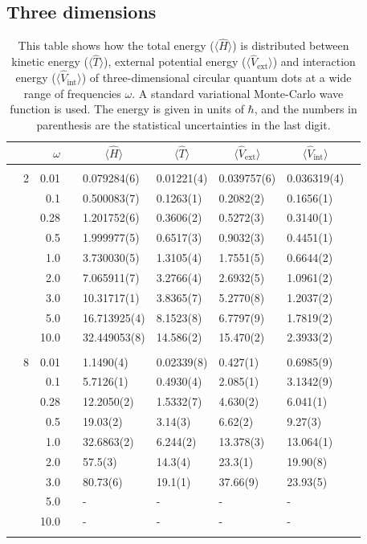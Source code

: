 \subsection{Three dimensions}
\begin{table}
	\caption{This table shows how the total energy ($\langle\hat{H}\rangle$) is distributed between kinetic energy ($\langle\hat{T}\rangle$), external potential energy ($\langle\hat{V}_{\text{ext}}\rangle$) and interaction energy ($\langle\hat{V}_{\text{int}}\rangle$) of three-dimensional circular quantum dots at a wide range of frequencies $\omega$. A standard variational Monte-Carlo wave function is used. The energy is given in units of $\hbar$, and the numbers in parenthesis are the statistical uncertainties in the last digit.}
	\label{tab:splitfrequencyQDVMC3D}
	\begin{tabularx}{\textwidth}{R{1cm}rrcR{2.3cm}R{2.3cm}R{2.3cm}R{2.3cm}R{1cm}} \hline\hline
		&\makecell{\\ \phantom{$N$} \\ \phantom{=}} & $\omega$ &&  &  &  &  & \\ \hline \\
		&2 & 0.01 && 0.079284(6) & 0.01221(4) & 0.039757(6) & 0.036319(4) \\
		&& 0.1 && 0.500083(7) & 0.1263(1) & 0.2082(2) & 0.1656(1) \\
		&& 0.28 && 1.201752(6) & 0.3606(2) & 0.5272(3) & 0.3140(1) \\
		&& 0.5 && 1.999977(5) & 0.6517(3) & 0.9032(3) & 0.4451(1) \\
		&& 1.0 && 3.730030(5) & 1.3105(4) & 1.7551(5) & 0.6644(2) \\
		&& 2.0 && 7.065911(7) & 3.2766(4) & 2.6932(5) & 1.0961(2) \\
		&& 3.0 && 10.31717(1) & 3.8365(7) & 5.2770(8) & 1.2037(2) \\ 
		&& 5.0 && 16.713925(4) & 8.1523(8) & 6.7797(9) & 1.7819(2) \\
		&& 10.0 && 32.449053(8) & 14.586(2) & 15.470(2) & 2.3933(2) \\
		\hdashline \\
		
		&8 & 0.01 && 1.1490(4) & 0.02339(8) & 0.427(1) & 0.6985(9) \\
		&& 0.1 && 5.7126(1) & 0.4930(4) & 2.085(1) & 3.1342(9) \\
		&& 0.28 && 12.2050(2) & 1.5332(7) & 4.630(2) & 6.041(1) \\
		&& 0.5 && 19.03(2) & 3.14(3) & 6.62(2) & 9.27(3) \\
		&& 1.0 && 32.6863(2) & 6.244(2) & 13.378(3) & 13.064(1) \\
		&& 2.0 && 57.5(3) & 14.3(4) & 23.3(1) & 19.90(8) \\
		&& 3.0 && 80.73(6) & 19.1(1) & 37.66(9) & 23.93(5) \\ 
		&& 5.0 && - & - & - & -\\
		&& 10.0 && - & - & - & -\\
		\hdashline \\
		

\end{tabularx}
\end{table}
